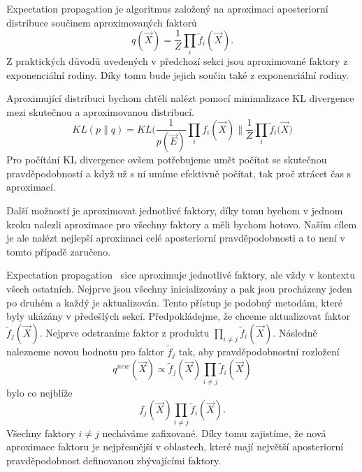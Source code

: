 Expectation propagation je algoritmus založený na aproximaci aposteriorní distribuce součinem aproximovaných faktorů
\begin{equation}
q(\vec{X}) = \frac{1}{Z} \prod_i \tilde{f}_i(\vec{X}).
\end{equation}
Z praktických důvodů uvedených v předchozí sekci jsou aproximované faktory z exponenciální rodiny.
Díky tomu bude jejich součin také z exponenciální rodiny.

Aproximující distribuci bychom chtěli nalézt pomocí minimalizace KL divergence mezi skutečnou a aproximovanou distribucí.
\begin{equation}
KL(p \| q) = KL\bigg(\frac{1}{p(\vec{E})} \prod_i f_i(\vec{X}) \bigg\| \frac{1}{Z} \prod_i \tilde{f}_i(\vec{X} \bigg)
\end{equation}
Pro počítání KL divergence ovšem potřebujeme umět počítat se skutečnou pravděpodobností a když už s ní umíme efektivně počítat, tak proč ztrácet čas s aproximací.

Další možností je aproximovat jednotlivé faktory, díky tomu bychom v jednom kroku nalezli aproximace pro všechny faktory a měli bychom hotovo.
Naším cílem je ale nalézt nejlepší aproximaci celé aposteriorní pravděpodobnosti a to není v tomto případě zaručeno.

Expectation propagation~\cite{bishop2006pattern} sice aproximuje jednotlivé faktory, ale vždy v kontextu všech ostatních.
Nejprve jsou všechny inicializovány a pak jsou procházeny jeden po druhém a každý je aktualizován.
Tento přístup je podobný metodám, které byly ukázány v předešlých sekcí.
Předpokládejme, že chceme aktualizovat faktor $\tilde{f}_j (\vec{X})$.
Nejprve odstraníme faktor z produktu $\prod_{i \ne j} \tilde{f}_i(\vec{X})$.
Následně nalezneme novou hodnotu pro faktor $\tilde{f}_j$ tak, aby pravděpodobnostní rozložení
\begin{equation}
q^{new}(\vec{X}) \propto \tilde{f}_j(\vec{X}) \prod_{i \ne j} \tilde{f}_i(\vec{X})
\label{eq:qnew}
\end{equation}
bylo co nejblíže 
\begin{equation}
f_j(\vec{X})\prod_{i \ne j} \tilde{f}_i(\vec{X}).
\end{equation}
Všechny faktory $i \ne j$ necháváme zafixované. 
Díky tomu zajistíme, že nová aproximace faktoru je nejpřesnější v oblastech, které mají největší aposteriorní pravděpodobnost definovanou zbývajícími faktory.

